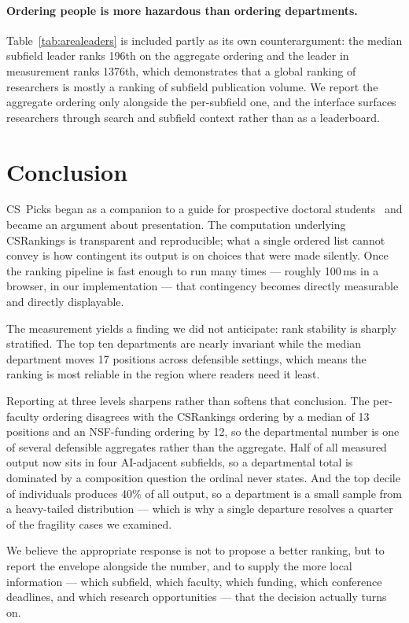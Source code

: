 \documentclass[11pt]{article}
\newcommand{\sys}{CS~Picks}
\newcommand{\csr}{CSRankings}
\begin{document}
\paragraph{Ordering people is more hazardous than ordering departments.}
Table~\ref{tab:arealeaders} is included partly as its own counterargument: the
median subfield leader ranks 196th on the aggregate ordering and the leader in
measurement ranks 1376th, which demonstrates that a global ranking of
researchers is mostly a ranking of subfield publication volume. We report the aggregate
ordering only alongside the per-subfield one, and the interface surfaces
researchers through search and subfield context rather than as a leaderboard.

\section{Conclusion}

\sys{} began as a companion to a guide for prospective doctoral
students~\cite{phddemystify} and became an argument about presentation. The
computation underlying \csr{} is transparent and reproducible; what a single
ordered list cannot convey is how contingent its output is on choices that were
made silently. Once the ranking pipeline is fast enough to run many times ---
roughly 100\,ms in a browser, in our implementation --- that contingency
becomes directly measurable and directly displayable.

The measurement yields a finding we did not anticipate: rank stability is
sharply stratified. The top ten departments are nearly invariant while the
median department moves 17 positions across defensible settings, which means
the ranking is most reliable in the region where readers need it least.

Reporting at three levels sharpens rather than softens that conclusion. The
per-faculty ordering disagrees with the \csr{} ordering by a median of 13
positions and an NSF-funding ordering by 12, so the departmental number is one
of several defensible aggregates rather than the aggregate. Half of all
measured output now sits in four AI-adjacent subfields, so a departmental total
is dominated by a composition question the ordinal never states. And the top
decile of individuals produces 40\% of all output, so a department is a small
sample from a heavy-tailed distribution --- which is why a single departure
resolves a quarter of the fragility cases we examined.

We believe the appropriate response is not to propose a better ranking, but to
report the envelope alongside the number, and to supply the more local
information --- which subfield, which faculty, which funding, which conference
deadlines, and which research opportunities --- that the decision actually
turns on.



\end{document}
